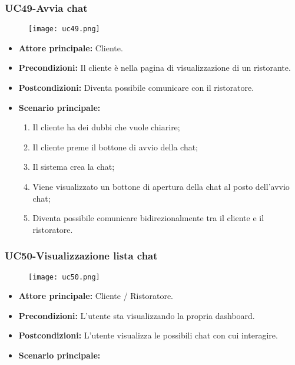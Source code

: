 \pagebreak
\subsubsection{UC49-Avvia chat}
\begin{figure}[h] \texttt{[image: uc49.png]} \end{figure}
\begin{itemize}
\item \textbf{Attore principale:} Cliente.
\item \textbf{Precondizioni:} Il cliente è nella pagina di visualizzazione di un ristorante.
\item \textbf{Postcondizioni:} Diventa possibile comunicare con il ristoratore.
\item \textbf{Scenario principale:}
\begin{enumerate}
    \item Il cliente ha dei dubbi che vuole chiarire;
    \item Il cliente preme il bottone di avvio della chat;
    \item Il sistema crea la chat;
    \item Viene visualizzato un bottone di apertura della chat al posto dell'avvio chat;
    \item Diventa possibile comunicare bidirezionalmente tra il cliente e il ristoratore.
\end{enumerate}
\end{itemize}

\subsubsection{UC50-Visualizzazione lista chat}
\begin{figure}[h] \texttt{[image: uc50.png]} \end{figure}
\begin{itemize}
\item \textbf{Attore principale:} Cliente / Ristoratore.
\item \textbf{Precondizioni:} L'utente sta visualizzando la propria dashboard.
\item \textbf{Postcondizioni:} L'utente visualizza le possibili chat con cui interagire.
\item \textbf{Scenario principale:}
\end{itemize}

